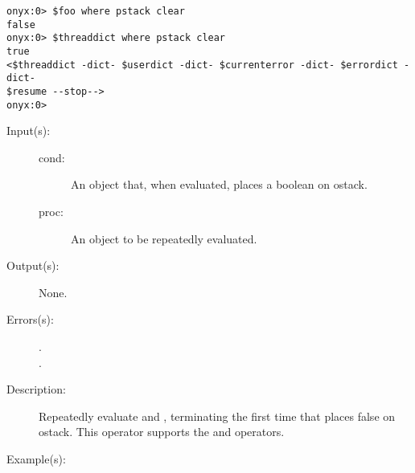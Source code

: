 \begin{description}
\begin{description}
\begin{verbatim}
onyx:0> $foo where pstack clear
false
onyx:0> $threaddict where pstack clear
true
<$threaddict -dict- $userdict -dict- $currenterror -dict- $errordict -dict-
$resume --stop-->
onyx:0>
		\end{verbatim}
	\end{description}
\label{systemdict:while}
\item[{\onyxop{cond proc}{while}{--}}: ]
	\begin{description}\item[]
	\item[Input(s): ]
		\begin{description}\item[]
		\item[cond: ]
			An object that, when evaluated, places a boolean on
			ostack.
		\item[proc: ]
			An object to be repeatedly evaluated.
		\end{description}
	\item[Output(s): ] None.
	\item[Errors(s): ]
		\begin{description}\item[]
		\item[.]
		\item[.]
		\end{description}
	\item[Description: ]
		Repeatedly evaluate  and , terminating
		the first time that  places false on ostack.  This
		operator supports the
		 and
		 operators.
	\item[Example(s): ]\begin{verbatim}


\end{verbatim}
\end{description}
\end{description}
